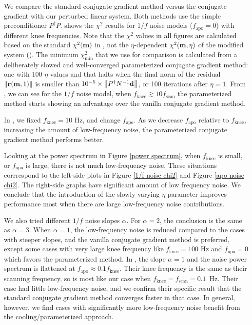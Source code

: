 \documentclass[twocolumn,linenumbers]{aastex631}
\newcommand{\Eq}[1]{\text{Eq.\,\ref{#1}}}
\newcommand{\Figure}[1]{\text{Figure \ref{#1}}}
\newcommand{\vbd}{\vb{d}}
\newcommand{\vbm}{\vb{m}}
\newcommand{\Pdagger}{P^{\dagger}}
\begin{document}
\begin{CJK*}{UTF8}{gbsn}
{
We compare the standard conjugate gradient method versus the conjugate gradient with our perturbed linear system.
Both methods use the simple preconditioner $\Pdagger P$.
}
\Figure{1/f noise chi2} shows {the $\chi^2$ results} for {$1/f$ noise models} ($f_\text{apo}=0$)  with different knee frequencies.
Note that the $\chi^2$ values in all figures are calculated based on the standard $\chi^2(\vbm)$ in \Eq{chi2 formula},
not the $\eta$-dependent $\chi^2(\vbm, \eta)$ of the modified system (\Eq{chi2 eta formula}).
The minimum $\chi^2_{\text{min}}$ that we use for comparison is calculated from a deliberately slowed and well-converged parameterized conjugate gradient
method: one with 100 $\eta$ values and that halts when the final norm of the residual $\norm{\vb{r}(\vbm,1)}$
is smaller than $10^{-5}\times\norm{\Pdagger N^{-1} \vbd}$, or 100 iterations after $\eta=1$.
From \Figure{1/f noise chi2}, we can see for the $1/f$ noise model,
when $f_\text{knee} \gtrsim 10 f_\text{scan}$ the parameterized method starts showing an advantage
over {the} vanilla conjugate gradient method.


In \Figure{apo noise chi2}, we fixed $f_\text{knee}=10$ Hz, and change $f_\text{apo}$.
As we decrease $f_\text{apo}$ relative to $f_\text{knee}$, increasing the amount of low-frequency noise,  the parameterized conjugate gradient method performs better.

Looking at the power spectrum in Figure \ref{power spectrum},
when $f_\text{knee}$ is small, or $f_\text{apo}$ is large, there is not much low-frequency noise.
These situations corrrespond to the left-side plots in Figure \ref{1/f noise chi2} and Figure \ref{apo noise chi2}.
The right-side graphs have significant amount of low frequency noise.
We conclude that the introduction of the slowly-varying $\eta$ parameter improves performance most when there are large low-frequency noise contributions.


We also tried different $1/f$ noise slopes $\alpha$. For $\alpha=2$, the conclusion is the
same as $\alpha=3$. When $\alpha=1$, the low-frequency noise is reduced compared to the cases with steeper slopes, and
the vanilla conjugate gradient method is preferred, except some cases with very large
knee frequency like $f_\text{knee} = 100$ Hz and $f_\text{apo}=0$ which favors the
parameterized method.
In \citet{2018A&A...620A..59P}, the slope $\alpha = 1$ and  the noise power spectrum is flattened at $f_\text{apo} \approx 0.1 f_\text{knee}$. Their knee frequency is the same as their scanning frequency, so is most like our case when $f_\text{knee}=f_\text{scan}=0.1$~Hz.  Their case had little low-frequency noise, and we confirm their specific result that the standard conjugate gradient method converges faster in that case.  In general, however, we find cases with significantly more low-frequency noise benefit from the cooling/parameterized approach.





\end{CJK*}
\end{document}
